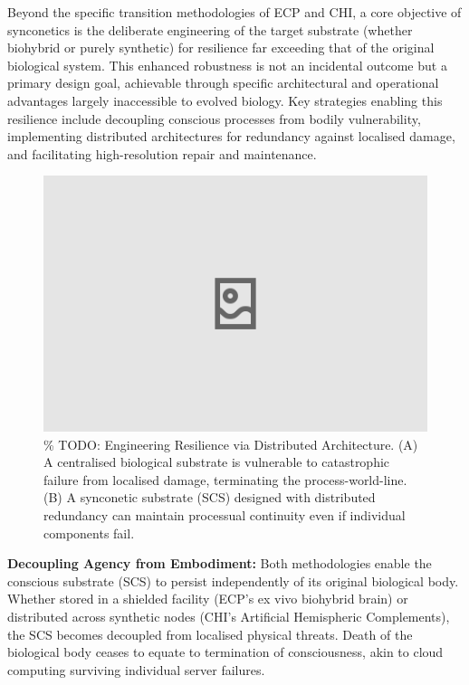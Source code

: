 \documentclass[10pt]{article}
\begin{document}
\begin{sloppypar}
  Beyond the specific transition methodologies of ECP and CHI, a core objective of synconetics is the deliberate engineering of the target substrate (whether biohybrid or purely synthetic) for resilience far exceeding that of the original biological system. This enhanced robustness is not an incidental outcome but a primary design goal, achievable through specific architectural and operational advantages largely inaccessible to evolved biology. Key strategies enabling this resilience include decoupling conscious processes from bodily vulnerability, implementing distributed architectures for redundancy against localised damage, and facilitating high-resolution repair and maintenance.

  \begin{figure}[ht!]
    \centering
    \includegraphics[width=\textwidth]{figures/resilience-redundancy.png}
    \caption{\% TODO: Engineering Resilience via Distributed Architecture. (A) A centralised biological substrate is vulnerable to catastrophic failure from localised damage, terminating the process-world-line. (B) A synconetic substrate (SCS) designed with distributed redundancy can maintain processual continuity even if individual components fail.}
    \label{fig:resilience-redundancy}
  \end{figure}

  \textbf{Decoupling Agency from Embodiment:} Both methodologies enable the conscious substrate (SCS) to persist independently of its original biological body. Whether stored in a shielded facility (ECP’s ex vivo biohybrid brain) or distributed across synthetic nodes (CHI’s Artificial Hemispheric Complements), the SCS becomes decoupled from localised physical threats. Death of the biological body ceases to equate to termination of consciousness, akin to cloud computing surviving individual server failures.


\end{sloppypar}
\end{document}
